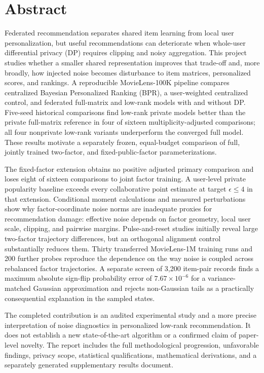 \section*{Abstract}
Federated recommendation separates shared item learning from local user personalization,
but useful recommendations can deteriorate when whole-user differential privacy (DP)
requires clipping and noisy aggregation. This project studies whether a smaller shared
representation improves that trade-off and, more broadly, how injected noise becomes
disturbance to item matrices, personalized scores, and rankings. A reproducible
MovieLens-100K pipeline compares centralized Bayesian Personalized Ranking (BPR), a
user-weighted centralized control, and federated full-matrix and low-rank models with
and without DP. Five-seed historical comparisons find low-rank private models better
than the private full-matrix reference in four of sixteen multiplicity-adjusted
comparisons; all four nonprivate low-rank variants underperform the converged full
model. These results motivate a separately frozen, equal-budget comparison of full,
jointly trained two-factor, and fixed-public-factor parameterizations.

The fixed-factor extension obtains no positive adjusted primary comparison and loses
eight of sixteen comparisons to joint factor training. A user-level private popularity
baseline exceeds every collaborative point estimate at target $\epsilon\leq4$ in
that extension. Conditional moment calculations and measured perturbations show why
factor-coordinate noise norms are inadequate proxies for recommendation damage:
effective noise depends on factor geometry, local user scale, clipping, and pairwise
margins. Pulse-and-reset studies initially reveal large two-factor trajectory
differences, but an orthogonal alignment control substantially reduces them. Thirty
transferred MovieLens-1M training runs and 200 further probes reproduce the dependence
on the way noise is coupled across rebalanced factor trajectories. A separate screen
of 3,200 item-pair records finds a maximum absolute sign-flip probability error of
$7.67\times10^{-6}$ for a variance-matched Gaussian approximation and rejects
non-Gaussian tails as a practically consequential explanation in the sampled states.

The completed contribution is an audited experimental study and a more precise
interpretation of noise diagnostics in personalized low-rank recommendation. It
does not establish a new state-of-the-art algorithm or a confirmed claim of
paper-level novelty. The report includes the full methodological progression,
unfavorable findings, privacy scope, statistical qualifications, mathematical
derivations, and a separately generated supplementary results document.


